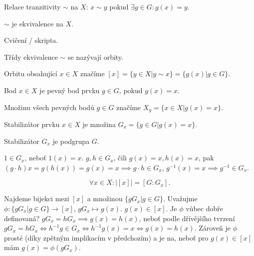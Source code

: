 \documentclass[12pt]{article}                   %
\begin{document}
        \begin{definice}
            Relace tranzitivity $\sim$ na $X$: $x \sim y$ pokud $\exists g \in G: g(x) = y$.
        \end{definice}

        \begin{lemma}
            $\sim$ je ekvivalence na $X$.

            \begin{dukazin}
                Cvičení / skripta.
            \end{dukazin}
        \end{lemma}

        \begin{definice}[Orbita]
            Třídy ekvivalence $\sim$ se nazývají orbity.

            Orbitu obsahující $x \in X$ značíme $[x] = \{y \in X | y \sim x\} = \{g(x) | g \in G\}$.
        \end{definice}

        \begin{definice}
            Bod $x \in X$ je pevný bod prvku $g \in G$, pokud $g(x) = x$.

            Množinu všech pevných bodů $g \in G$ značíme $X_g = \{x \in X | g(x) = x\}$.

            Stabilizátor prvku $x \in X$ je množina $G_x = \{g \in G | g(x) = x\}$.
        \end{definice}

        \begin{lemma}
            Stabilizátor $G_x$ je podgrupa $G$.

            \begin{dukazin}
                $1 \in G_x$, neboť $1(x) = x$. $g, h \in G_x$, čili $g(x) = x, h(x) = x$, pak $(g·h)x = g(h(x)) = g(x) = x \implies g·h \in G_x$, $g^{-1}(x) = x \implies g^{-1} \in G_x$.
            \end{dukazin}
        \end{lemma}

        \begin{tvrzeni}
            $$ \forall x \in X: |[x]| = [G : G_x]. $$

            \begin{dukazin}
                Najdeme bijekci mezi $[x]$ a množinou $\{gG_x | g \in G\}$. Uvažujme $\phi: \{gG_x | g \in G\} \rightarrow [x]$, $gG_x \mapsto g(x)$. $g(x) \in [x]$. Je $\phi$ vůbec dobře definovaná? $gG_x = hG_x \implies g(x) = h(x)$, neboť podle dřívějšího tvrzení $gG_x = hG_x \Leftrightarrow h^{-1}g \in G_x \Leftrightarrow h^{-1}g(x) = x \Leftrightarrow g(x) = h(x)$. Zároveň je $\phi$ prosté (díky zpětným implikacím v předchozím) a je na, neboť pro $g(x) \in [x]$ mám $g(x) = \phi(gG_x)$.
            \end{dukazin}
        \end{tvrzeni}
\end{document}

